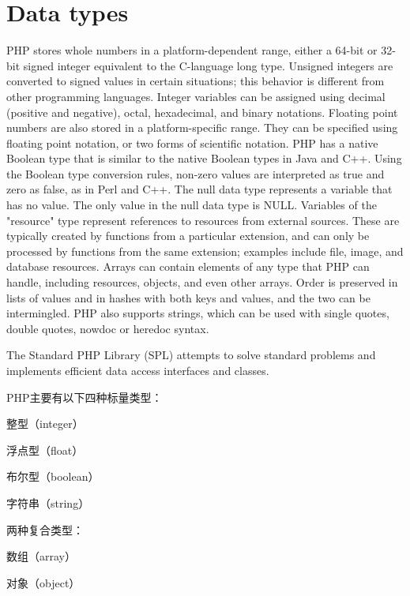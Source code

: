 \section{Data types}

PHP stores whole numbers in a platform-dependent range, either a 64-bit or 32-bit signed integer equivalent to the C-language long type. Unsigned integers are converted to signed values in certain situations; this behavior is different from other programming languages. Integer variables can be assigned using decimal (positive and negative), octal, hexadecimal, and binary notations. Floating point numbers are also stored in a platform-specific range. They can be specified using floating point notation, or two forms of scientific notation. PHP has a native Boolean type that is similar to the native Boolean types in Java and C++. Using the Boolean type conversion rules, non-zero values are interpreted as true and zero as false, as in Perl and C++. The null data type represents a variable that has no value. The only value in the null data type is NULL. Variables of the "resource" type represent references to resources from external sources. These are typically created by functions from a particular extension, and can only be processed by functions from the same extension; examples include file, image, and database resources. Arrays can contain elements of any type that PHP can handle, including resources, objects, and even other arrays. Order is preserved in lists of values and in hashes with both keys and values, and the two can be intermingled. PHP also supports strings, which can be used with single quotes, double quotes, nowdoc or heredoc syntax.

The Standard PHP Library (SPL) attempts to solve standard problems and implements efficient data access interfaces and classes.


PHP主要有以下四种标量类型：

\begin{compactitem}
\item 整型（integer）
\item 浮点型（float）
\item 布尔型（boolean）
\item 字符串（string）
\end{compactitem}

两种复合类型：

\begin{compactitem}
\item 数组（array）
\item 对象（object）
\end{compactitem}

